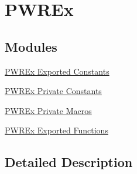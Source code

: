 \hypertarget{group___p_w_r_ex}{}\section{P\+W\+R\+Ex}
\label{group___p_w_r_ex}
\subsection*{Modules}
\begin{DoxyCompactItemize}
\item 
\hyperlink{group___p_w_r_ex___exported___constants}{P\+W\+R\+Ex Exported Constants}
\item 
\hyperlink{group___p_w_r_ex___private___constants}{P\+W\+R\+Ex Private Constants}
\item 
\hyperlink{group___p_w_r_ex___private___macros}{P\+W\+R\+Ex Private Macros}
\item 
\hyperlink{group___p_w_r_ex___exported___functions}{P\+W\+R\+Ex Exported Functions}
\end{DoxyCompactItemize}


\subsection{Detailed Description}
